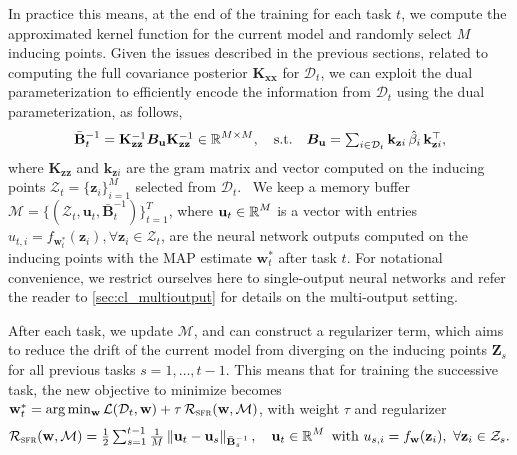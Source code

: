 \documentclass{article}
\newcommand{\our}{\textsc{sfr}\xspace}
\newcommand{\dataset}{\ensuremath{\mathcal{D}}}
\newcommand{\weights}{\ensuremath{\mathbf{w}}}
\newcommand{\mathbold}[1]{\bm{#1}}
\newcommand{\mbf}[1]{\mathbf{#1}}
\newcommand{\MB}{\mbf{B}}
\newcommand{\MZ}{\mbf{Z}}
\newcommand{\MX}{\mbf{X}}
\newcommand{\T}{\top}
\newcommand{\MBeta}[0]{\mathbold{B}}
\newcommand{\vz}{\mbf{z}}
\newcommand{\vu}{\mbf{u}}
\newcommand{\vw}{\mbf{w}}
\newcommand{\MKzz}{\mbf{K}_{\mbf{z}\mbf{z}}}
\newcommand{\MKxx}{\mbf{K}_{\mbf{x}\mbf{x}}}
\newcommand{\vkzi}{\mbf{k}_{\mbf{z}i}}
\begin{document}
In practice this means,  at the end of the training for each task $t$, we compute the approximated kernel function for the current model and randomly select $M$ inducing points. Given the issues described in the previous sections, related to computing the full covariance posterior $\MKxx$ for $\dataset_t$,\todo{this should be $\kappa(\MX_t, \MX_t)$} we can exploit the dual parameterization to efficiently encode the information from  $\dataset_t$ using the dual parameterization, as follows, 
%
\begin{equation}\textstyle
 	\bar{\MB}^{-1}_t = \MKzz^{-1} \MBeta_\vu \MKzz^{-1} \in \R^{M \times M}, 
 	\quad \text{s.t.} \quad
 	\MBeta_{\vu} =  \sum_{i \in \dataset_t} \vkzi \,\hat{\beta}_{i} \, \vkzi^{\T} ,    
\end{equation}
%
where $\MKzz$ and $\vkzi$ are the gram matrix and vector computed on the inducing points $\mathcal{Z}_t = \{\vz_i\}_{i=1}^M$ selected from $\dataset_t$.\
%
We keep a memory buffer $\mathcal{M} = \{(\mathcal{Z}_t, \vu_t, \bar{\MB}^{-1}_t)\}_{t=1}^T$, where $\vu_t \in \R^{M}$ is a vector with entries $u_{t, i} = f_{\vw_t^*}(\vz_i), \forall \vz_i \in \mathcal{Z}_t$, are the neural network outputs computed on the inducing points with the MAP estimate $\weights_t^*$ after task $t$. For notational convenience, we restrict ourselves here to single-output neural networks and refer the reader to \cref{sec:cl_multioutput} for details on the multi-output setting. 

After each task, we update $\mathcal{M}$, and can construct a regularizer term, which aims to reduce the drift of the current model from diverging on the inducing points $\MZ_s$ for all previous tasks $ s = 1, \ldots, t-1$. This means that for training  the successive task, the new objective to minimize becomes $\weights_t^* = \arg\min_{\weights} \mathcal{L}(\mathcal{D}_t, \weights) + \tau \, \mathcal{R}_\textrm{\our}(\weights, \mathcal{M})$, with weight $\tau$ and regularizer
%
\begin{equation}\label{eq-cl-regularizer}\textstyle
  \mathcal{R}_\mathrm{\our}(\weights, \mathcal{M}) = \frac{1}{2} \sum_{s=1}^{t-1} \frac{1}{M} 
	\left\lVert 
	\vu_t - \vu_s %
	\right\rVert_{\bar{\MB}^{-1}_{s}}, \quad \vu_t \in \R^M \text{~with~} u_{s,i} = f_{\weights}(\vz_{i}),~\forall {\vz_i} \in \mathcal{Z}_s .
\end{equation}
\end{document}
